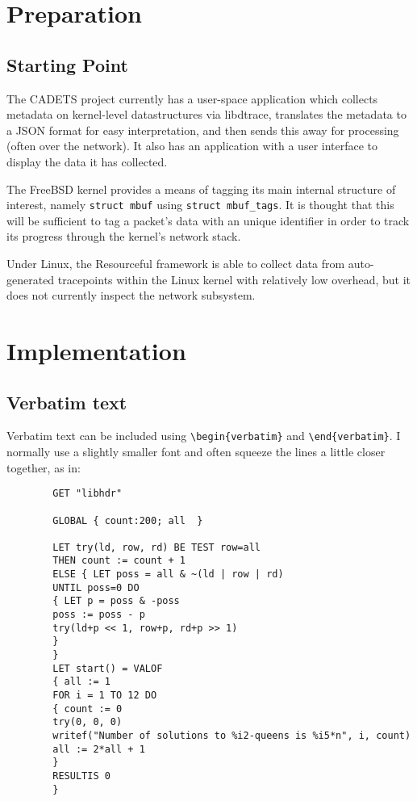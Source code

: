 \documentclass[a4paper,12pt,twoside,openright]{report}
\renewcommand{\baselinestretch}{1.1}    %
\begin{document}
	
	\chapter{Preparation}
	
	\section{Starting Point}
	
	The CADETS project currently has a user-space application which collects metadata on kernel-level	datastructures via libdtrace, translates the metadata to a JSON format for easy interpretation, and	then sends this away for processing (often over the network). It also has an application with a user interface to display the data it has collected.
	
	The FreeBSD kernel provides a means of tagging its main internal structure of interest, namely \verb|struct mbuf| using \verb|struct mbuf_tags|. It is thought that this will be sufficient to tag a packet’s data with an unique identifier in order to track its progress through the kernel’s network stack.
	
	Under Linux, the Resourceful framework is able to collect data from auto-generated tracepoints	within the Linux kernel with relatively low overhead, but it does not currently inspect the network subsystem.
	
	\chapter{Implementation}
	
	\section{Verbatim text}
	
	Verbatim text can be included using \verb|\begin{verbatim}| and
	\verb|\end{verbatim}|. I normally use a slightly smaller font and
	often squeeze the lines a little closer together, as in:
	
	{\renewcommand{\baselinestretch}{0.8}\small
		\begin{verbatim}
		GET "libhdr"
		
		GLOBAL { count:200; all  }
		
		LET try(ld, row, rd) BE TEST row=all
		THEN count := count + 1
		ELSE { LET poss = all & ~(ld | row | rd)
		UNTIL poss=0 DO
		{ LET p = poss & -poss
		poss := poss - p
		try(ld+p << 1, row+p, rd+p >> 1)
		}
		}
		LET start() = VALOF
		{ all := 1
		FOR i = 1 TO 12 DO
		{ count := 0
		try(0, 0, 0)
		writef("Number of solutions to %i2-queens is %i5*n", i, count)
		all := 2*all + 1
		}
		RESULTIS 0
		}
		\end{verbatim}
	}
	
\end{document}
